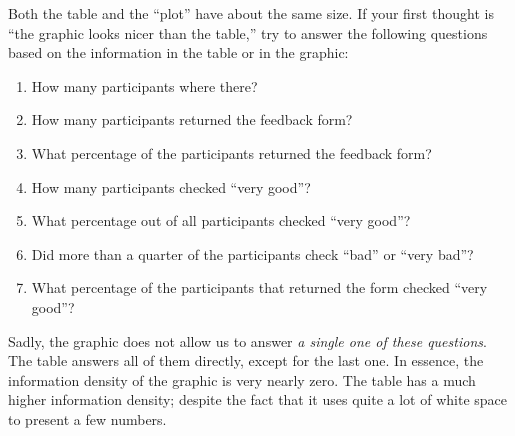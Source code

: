 \bigskip
\par
{}
\bigskip

Both the table and the ``plot'' have about the same size. If your first
thought is ``the graphic looks nicer than the table,'' try to answer
the following questions based on the information in the table or in
the graphic: 
\begin{enumerate}
\item
  How many participants where there?
\item
  How many participants returned the feedback form?
\item
  What percentage of the participants returned the feedback form?
\item
  How many participants checked ``very good''?
\item
  What percentage out of all participants checked ``very good''?
\item
  Did more than a quarter of the participants check ``bad'' or ``very bad''?
\item
  What percentage of the participants that returned the form checked ``very good''?
\end{enumerate}

Sadly, the graphic does not allow us to answer \emph{a single one of these
  questions}. The table answers all of them directly, except for the last
one. In essence, the information density of the graphic is very
nearly zero. The table has a much higher information density; despite
the fact that it uses quite a lot of white space to present a few numbers.

